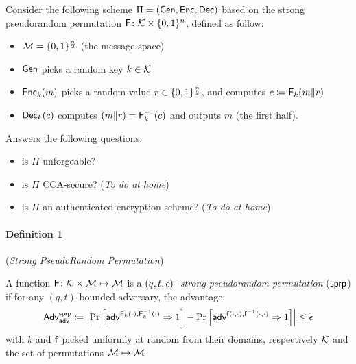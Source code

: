 \documentclass[12pt]{article}
\begin{document}
Consider the following scheme $\Pi=(\operatorname{\mathsf{Gen}},\operatorname{\mathsf{Enc}},\operatorname{\mathsf{Dec}})$ based on the strong pseudorandom permutation $\operatorname{\mathsf{F}} \colon \mathcal{K} \times \lbrace 0,1 \rbrace^n$, defined as follow:
\begin{itemize}
	\item $\mathcal{M}=\{0, 1\}^{\frac{n}{2}}$ (the message space)
	\item $\operatorname{\mathsf{Gen}}$ picks a random key $k \in \mathcal{K}$
	\item $\operatorname{\mathsf{Enc}}_k(m)$ picks a random value $r \in \{0, 1\}^{\frac{n}{2}}$, and computes $c \coloneqq \operatorname{\mathsf{F}}_k(m \| r)$
	\item $\operatorname{\mathsf{Dec}}_k(c)$ computes $(m\|r)=\operatorname{\mathsf{F}}^{-1}_k(c)$ and outputs $m$ (the first half).
\end{itemize}
Answers the following questions:
\begin{itemize}
	\item is $\Pi$ unforgeable?
	\item is $\Pi$ CCA-secure? (\emph{To do at home})
	\item is $\Pi$ an authenticated encryption scheme? (\emph{To do at home})
\end{itemize}

\paragraph{Definition 1} \label{def: sprp} (\emph{Strong PseudoRandom Permutation})

A function $\operatorname{\mathsf{F}} \colon \mathcal{K} \times \mathcal{M} \mapsto \mathcal{M}$ is a $(q,t,\epsilon)$-\emph{ strong pseudorandom permutation} ($\operatorname{\mathsf{sprp}}$) if for any $(q,t)$-bounded adversary, the advantage:
\[ \mathsf{Adv}^{\operatorname{\mathsf{sprp}}}_{\operatorname{\mathsf{adv}}}\coloneqq
\left| \Pr\left[ \operatorname{\mathsf{adv}}^{\operatorname{\mathsf{F}}_k(\cdot),\operatorname{\mathsf{F}}_k^{-1}(\cdot)}\Rightarrow 1 \right] -
\Pr\left[ \operatorname{\mathsf{adv}}^{\operatorname{\mathsf{f}}(\cdot,\cdot),\operatorname{\mathsf{f}}^{-1}(\cdot,\cdot)}\Rightarrow 1 \right] \right|
\leq \epsilon \]
with $k$  and $\operatorname{\mathsf{f}}$ picked uniformly at random from their domains, respectively $\mathcal{K}$ and the set of permutations $\mathcal{M} \mapsto \mathcal{M}$.
\end{document}
